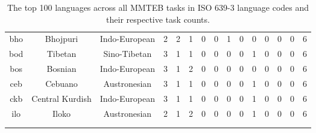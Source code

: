 \begin{longtable}{ccc|ccccccccccc|c}
    bho & Bhojpuri & Indo-European & 2 & 2 & 1 & 0 & 0 & 1 & 0 & 0 & 0 & 0 & 0 & 6 \\ 
    bod & Tibetan & Sino-Tibetan & 3 & 1 & 1 & 0 & 0 & 0 & 0 & 1 & 0 & 0 & 0 & 6 \\ 
    bos & Bosnian & Indo-European & 3 & 1 & 2 & 0 & 0 & 0 & 0 & 0 & 0 & 0 & 0 & 6 \\ 
    ceb & Cebuano & Austronesian & 3 & 1 & 1 & 0 & 0 & 0 & 0 & 1 & 0 & 0 & 0 & 6 \\ 
    ckb & Central Kurdish & Indo-European & 3 & 1 & 1 & 0 & 0 & 0 & 0 & 1 & 0 & 0 & 0 & 6 \\ 
    ilo & Iloko & Austronesian & 2 & 1 & 2 & 0 & 0 & 0 & 0 & 1 & 0 & 0 & 0 & 6 \\ 
    \\ \caption{The top 100 languages across all MMTEB tasks in ISO 639-3 language codes and their respective task counts.}
    \label{tab:task-lang}
\end{longtable}